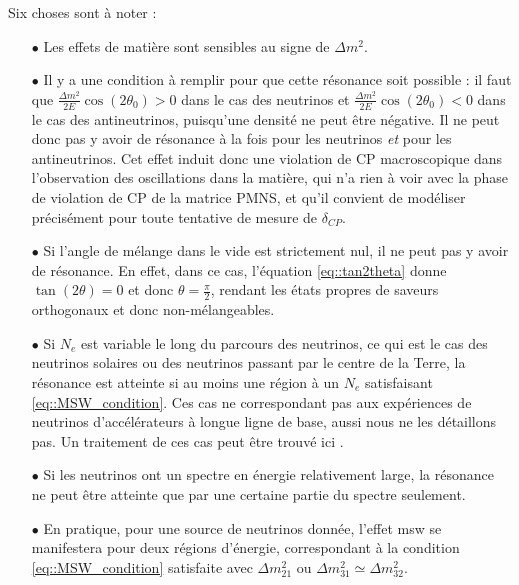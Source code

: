         Six choses sont à noter : 
        \begin{itemize}
          \item[$\bullet$] Les effets de matière sont sensibles au signe de $\Delta m^2$.
          \item[$\bullet$] Il y a une condition à remplir pour que cette résonance soit possible : il faut que $\frac{\Delta m^2}{2E}\cos(2\theta_0) > 0$ dans le cas des neutrinos et $\frac{\Delta m^2}{2E}\cos(2\theta_0) < 0$ dans le cas des antineutrinos, puisqu'une densité ne peut être négative. Il ne peut donc pas y avoir de résonance à la fois pour les neutrinos \textit{et} pour les antineutrinos. Cet effet induit donc une violation de CP macroscopique dans l'observation des oscillations dans la matière, qui n'a rien à voir avec la phase de violation de CP de la matrice PMNS, et qu'il convient de modéliser précisément pour toute tentative de mesure de $\delta_{CP}$.
          \item[$\bullet$] Si l'angle de mélange dans le vide est strictement nul, il ne peut pas y avoir de résonance. En effet, dans ce cas, l'équation \eqref{eq::tan2theta} donne $\tan(2\theta)=0$ et donc $\theta=\frac{\pi}{2}$, rendant les états propres de saveurs orthogonaux et donc non-mélangeables.
          \item[$\bullet$] Si $N_e$ est variable le long du parcours des neutrinos, ce qui est le cas des neutrinos solaires ou des neutrinos passant par le centre de la Terre, la résonance est atteinte si au moins une région à un $N_e$ satisfaisant \eqref{eq::MSW_condition}. Ces cas ne correspondant pas aux expériences de neutrinos d'accélérateurs à longue ligne de base, aussi nous ne les détaillons pas. Un traitement de ces cas peut être trouvé ici \cite{Akhmedov2000}.
          \item[$\bullet$] Si les neutrinos ont un spectre en énergie relativement large, la résonance ne peut être atteinte que par une certaine partie du spectre seulement.
          \item[$\bullet$] En pratique, pour une source de neutrinos donnée, l'effet \gls{msw} se manifestera pour deux régions d'énergie, correspondant à la condition \eqref{eq::MSW_condition} satisfaite avec $\Delta m^2_{21}$ ou $\Delta m^2_{31}\simeq\Delta m^2_{32}$.
        \end{itemize}



